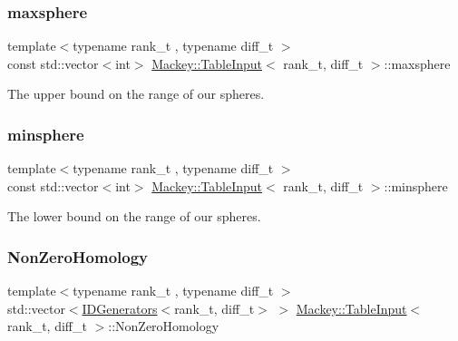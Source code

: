 \subsubsection{\texorpdfstring{maxsphere}{maxsphere}}
{\footnotesize\ttfamily template$<$typename rank\+\_\+t , typename diff\+\_\+t $>$ \\
const std\+::vector$<$int$>$ \hyperlink{classMackey_1_1TableInput}{Mackey\+::\+Table\+Input}$<$ rank\+\_\+t, diff\+\_\+t $>$\+::maxsphere\hspace{0.3cm}{\ttfamily [protected]}}



The upper bound on the range of our spheres. 

\mbox{\label{classMackey_1_1TableInput_a3f4bf3973cebe4bc2d305d111fa8b478}} 
\subsubsection{\texorpdfstring{minsphere}{minsphere}}
{\footnotesize\ttfamily template$<$typename rank\+\_\+t , typename diff\+\_\+t $>$ \\
const std\+::vector$<$int$>$ \hyperlink{classMackey_1_1TableInput}{Mackey\+::\+Table\+Input}$<$ rank\+\_\+t, diff\+\_\+t $>$\+::minsphere\hspace{0.3cm}{\ttfamily [protected]}}



The lower bound on the range of our spheres. 

\mbox{\label{classMackey_1_1TableInput_a337fa51024c06d4f9085d8bf00b6001c}} 
\subsubsection{\texorpdfstring{Non\+Zero\+Homology}{NonZeroHomology}}
{\footnotesize\ttfamily template$<$typename rank\+\_\+t , typename diff\+\_\+t $>$ \\
std\+::vector$<$\hyperlink{classMackey_1_1IDGenerators}{I\+D\+Generators}$<$rank\+\_\+t, diff\+\_\+t$>$ $>$ \hyperlink{classMackey_1_1TableInput}{Mackey\+::\+Table\+Input}$<$ rank\+\_\+t, diff\+\_\+t $>$\+::Non\+Zero\+Homology\hspace{0.3cm}{\ttfamily [protected]}}



